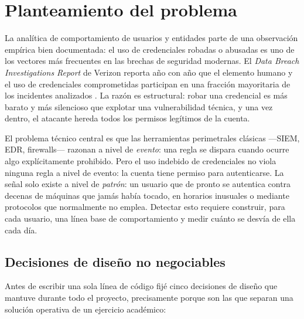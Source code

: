 \documentclass[12pt, a4paper]{article}
\begin{document}
\section{Planteamiento del problema}

La analítica de comportamiento de usuarios y entidades parte de una observación empírica bien
documentada: el uso de credenciales robadas o abusadas es uno de los vectores más frecuentes en las
brechas de seguridad modernas. El \textit{Data Breach Investigations Report} de Verizon reporta año
con año que el elemento humano y el uso de credenciales comprometidas participan en una fracción
mayoritaria de los incidentes analizados \cite{verizon2024}. La razón es estructural: robar una
credencial es más barato y más silencioso que explotar una vulnerabilidad técnica, y una vez dentro,
el atacante hereda todos los permisos legítimos de la cuenta.

El problema técnico central es que las herramientas perimetrales clásicas ---SIEM, EDR, firewalls---
razonan a nivel de \textit{evento}: una regla se dispara cuando ocurre algo explícitamente
prohibido. Pero el uso indebido de credenciales no viola ninguna regla a nivel de evento: la cuenta
tiene permiso para autenticarse. La señal solo existe a nivel de \textit{patrón}: un usuario que de
pronto se autentica contra decenas de máquinas que jamás había tocado, en horarios inusuales o
mediante protocolos que normalmente no emplea. Detectar esto requiere construir, para cada usuario,
una línea base de comportamiento y medir cuánto se desvía de ella cada día.

\subsection{Decisiones de diseño no negociables}

Antes de escribir una sola línea de código fijé cinco decisiones de diseño que mantuve durante todo
el proyecto, precisamente porque son las que separan una solución operativa de un ejercicio
académico:
\end{document}
